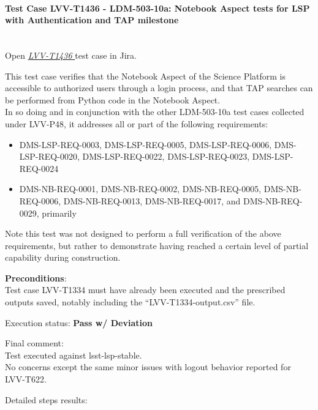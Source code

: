 \documentclass[DM,lsstdraft,STR,toc]{lsstdoc}
\providecommand{\tightlist}{
  \setlength{\itemsep}{0pt}\setlength{\parskip}{0pt}}
\begin{document}
\paragraph{Test Case LVV-T1436 - LDM-503-10a: Notebook Aspect tests for LSP with Authentication and TAP
milestone
 }\mbox{}\\

Open  \href{https://jira.lsstcorp.org/secure/Tests.jspa#/testCase/LVV-T1436}{\textit{ LVV-T1436 } }
test case in Jira.

This test case verifies that the Notebook Aspect of the Science Platform
is accessible to authorized users through a login process, and that TAP
searches can be performed from Python code in the Notebook
Aspect.\\[2\baselineskip]In so doing and in conjunction with the other
LDM-503-10a test cases collected under LVV-P48, it addresses all or part
of the following requirements:

\begin{itemize}
\tightlist
\item
  DMS-LSP-REQ-0003, DMS-LSP-REQ-0005, DMS-LSP-REQ-0006,
  DMS-LSP-REQ-0020, DMS-LSP-REQ-0022, DMS-LSP-REQ-0023, DMS-LSP-REQ-0024
\item
  DMS-NB-REQ-0001, DMS-NB-REQ-0002, DMS-NB-REQ-0005, DMS-NB-REQ-0006,
  DMS-NB-REQ-0013, DMS-NB-REQ-0017, and DMS-NB-REQ-0029, primarily
\end{itemize}

Note this test was not designed to perform a full verification of the
above requirements, but rather to demonstrate having reached a certain
level of partial capability during construction.


\textbf{ Preconditions}:\\
Test case LVV-T1334 must have already been executed and the prescribed
outputs saved, notably including the ``LVV-T1334-output.csv'' file.


Execution status: {\bf Pass w/ Deviation }

Final comment:\\Test executed against lsst-lsp-stable.\\
No concerns except the same minor issues with logout behavior reported
for LVV-T622.



Detailed steps results:
\end{document}
